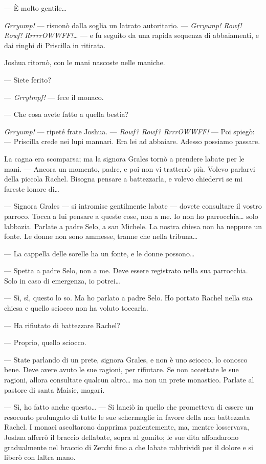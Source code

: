 --- È molto gentile\ldots{}

\emph{Grryump!} --- risuonò dalla soglia un latrato autoritario. ---
\emph{Grryump! Rowf! Rowf! RrrrrOWWFF!\ldots{}} --- e fu seguito da una
rapida sequenza di abbaiamenti, e dai ringhi di Priscilla in ritirata.

Joshua ritornò, con le mani nascoste nelle maniche.

--- Siete ferito?

--- \emph{Grrytmpf!} --- fece il monaco.

--- Che cosa avete fatto a quella bestia?

\emph{Grryump!} --- ripeté frate Joshua. --- \emph{Rowf? Rowf?
	RrrrOWWFF!} --- Poi spiegò: --- Priscilla crede nei lupi mannari. Era
lei ad abbaiare. Adesso possiamo passare.

La cagna era scomparsa; ma la signora Grales tornò a prendere
l\textquotesingle abate per le mani. --- Ancora un momento, padre, e poi
non vi tratterrò più. Volevo parlarvi della piccola Rachel. Bisogna
pensare a battezzarla, e volevo chiedervi se mi fareste
l\textquotesingle onore di\ldots{}

--- Signora Grales --- si intromise gentilmente l\textquotesingle abate
--- dovete consultare il vostro parroco. Tocca a lui pensare a queste
cose, non a me. Io non ho parrocchia\ldots{} solo
l\textquotesingle abbazia. Parlate a padre Selo, a san Michele. La
nostra chiesa non ha neppure un fonte. Le donne non sono ammesse, tranne
che nella tribuna\ldots{}

--- La cappella delle sorelle ha un fonte, e le donne possono\ldots{}

--- Spetta a padre Selo, non a me. Deve essere registrato nella sua
parrocchia. Solo in caso di emergenza, io potrei\ldots{}

--- Sì, sì, questo lo so. Ma ho parlato a padre Selo. Ho portato Rachel
nella sua chiesa e quello sciocco non ha voluto toccarla.

--- Ha rifiutato di battezzare Rachel?

--- Proprio, quello sciocco.

--- State parlando di un prete, signora Grales, e non è uno sciocco, lo
conosco bene. Deve avere avuto le sue ragioni, per rifiutare. Se non
accettate le sue ragioni, allora consultate qualcun altro\ldots{} ma non
un prete monastico. Parlate al pastore di santa Maisie, magari.

--- Sì, ho fatto anche questo\ldots{} --- Si lanciò in quello che
prometteva di essere un resoconto prolungato di tutte le sue schermaglie
in favore della non battezzata Rachel. I monaci ascoltarono dapprima
pazientemente, ma, mentre l\textquotesingle osservava, Joshua afferrò il
braccio dell\textquotesingle abate, sopra al gomito; le sue dita
affondarono gradualmente nel braccio di Zerchi fino a che
l\textquotesingle abate rabbrividì per il dolore e si liberò con
l\textquotesingle altra mano.


